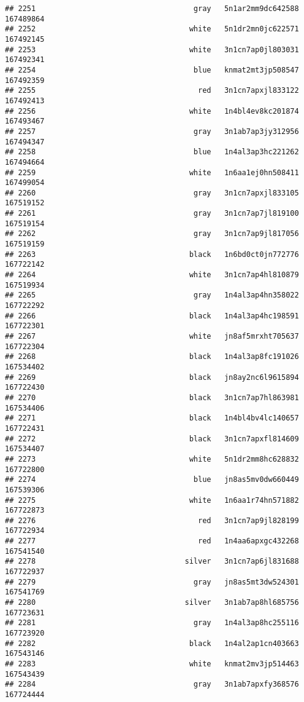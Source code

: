 \documentclass[
]{article}
\begin{document}
\begin{verbatim}
## 2251                                    gray   5n1ar2mm9dc642588 167489864
## 2252                                   white   5n1dr2mn0jc622571 167492145
## 2253                                   white   3n1cn7ap0jl803031 167492341
## 2254                                    blue   knmat2mt3jp508547 167492359
## 2255                                     red   3n1cn7apxjl833122 167492413
## 2256                                   white   1n4bl4ev8kc201874 167493467
## 2257                                    gray   3n1ab7ap3jy312956 167494347
## 2258                                    blue   1n4al3ap3hc221262 167494664
## 2259                                   white   1n6aa1ej0hn508411 167499054
## 2260                                    gray   3n1cn7apxjl833105 167519152
## 2261                                    gray   3n1cn7ap7jl819100 167519154
## 2262                                    gray   3n1cn7ap9jl817056 167519159
## 2263                                   black   1n6bd0ct0jn772776 167722142
## 2264                                   white   3n1cn7ap4hl810879 167519934
## 2265                                    gray   1n4al3ap4hn358022 167722292
## 2266                                   black   1n4al3ap4hc198591 167722301
## 2267                                   white   jn8af5mrxht705637 167722304
## 2268                                   black   1n4al3ap8fc191026 167534402
## 2269                                   black   jn8ay2nc6l9615894 167722430
## 2270                                   black   3n1cn7ap7hl863981 167534406
## 2271                                   black   1n4bl4bv4lc140657 167722431
## 2272                                   black   3n1cn7apxfl814609 167534407
## 2273                                   white   5n1dr2mm8hc628832 167722800
## 2274                                    blue   jn8as5mv0dw660449 167539306
## 2275                                   white   1n6aa1r74hn571882 167722873
## 2276                                     red   3n1cn7ap9jl828199 167722934
## 2277                                     red   1n4aa6apxgc432268 167541540
## 2278                                  silver   3n1cn7ap6jl831688 167722937
## 2279                                    gray   jn8as5mt3dw524301 167541769
## 2280                                  silver   3n1ab7ap8hl685756 167723631
## 2281                                    gray   1n4al3ap8hc255116 167723920
## 2282                                   black   1n4al2ap1cn403663 167543146
## 2283                                   white   knmat2mv3jp514463 167543439
## 2284                                    gray   3n1ab7apxfy368576 167724444

\end{verbatim}
\end{document}
